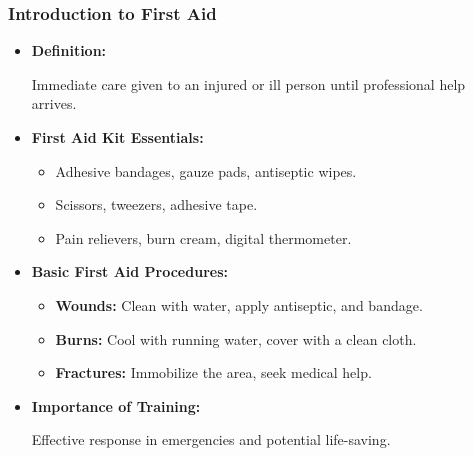 \begin{frame}[fragile]\frametitle{Introduction to First Aid}

      \begin{itemize}
        \item \textbf{Definition:} 
        
        Immediate care given to an injured or ill person until professional help arrives.
        
        \item \textbf{First Aid Kit Essentials:} 
        \begin{itemize}
            \item Adhesive bandages, gauze pads, antiseptic wipes.
            \item Scissors, tweezers, adhesive tape.
            \item Pain relievers, burn cream, digital thermometer.
        \end{itemize}
        \item \textbf{Basic First Aid Procedures:} 
        \begin{itemize}
            \item \textbf{Wounds:} Clean with water, apply antiseptic, and bandage.
            \item \textbf{Burns:} Cool with running water, cover with a clean cloth.
            \item \textbf{Fractures:} Immobilize the area, seek medical help.
        \end{itemize}
        \item \textbf{Importance of Training:} 
        
        Effective response in emergencies and potential life-saving.
        
      \end{itemize}

\end{frame}

